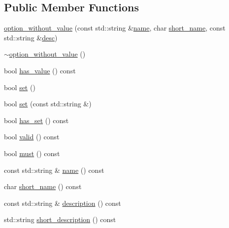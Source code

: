\subsection*{Public Member Functions}
\begin{DoxyCompactItemize}
\item 
\mbox{\hyperlink{classcmdline_1_1parser_1_1option__without__value_a3a750fc5d29bd692fdefd6f41b5ce341}{option\+\_\+without\+\_\+value}} (const std\+::string \&\mbox{\hyperlink{classcmdline_1_1parser_1_1option__without__value_a3b163022cec8a3e3cf816ea70a36abd4}{name}}, char \mbox{\hyperlink{classcmdline_1_1parser_1_1option__without__value_a6a4f9070fc44c46584515ad0a72a75af}{short\+\_\+name}}, const std\+::string \&\mbox{\hyperlink{classcmdline_1_1parser_1_1option__without__value_aef631becaab8312bd32051815f63275b}{desc}})
\item 
\mbox{\hyperlink{classcmdline_1_1parser_1_1option__without__value_a61b419f94d8f49212eea2c86bb2520e7}{$\sim$option\+\_\+without\+\_\+value}} ()
\item 
bool \mbox{\hyperlink{classcmdline_1_1parser_1_1option__without__value_abf481f9d4f936c8ab27fed99a747164f}{has\+\_\+value}} () const
\item 
bool \mbox{\hyperlink{classcmdline_1_1parser_1_1option__without__value_a14d3ef6f444aefebda41669d21b24008}{set}} ()
\item 
bool \mbox{\hyperlink{classcmdline_1_1parser_1_1option__without__value_ad8e93b69a9adb63f65a793d2c8099aae}{set}} (const std\+::string \&)
\item 
bool \mbox{\hyperlink{classcmdline_1_1parser_1_1option__without__value_aa56f159aff4c9cd7bde01294077724e8}{has\+\_\+set}} () const
\item 
bool \mbox{\hyperlink{classcmdline_1_1parser_1_1option__without__value_ad1dd50b3fd7c7020d817d1e173240ba3}{valid}} () const
\item 
bool \mbox{\hyperlink{classcmdline_1_1parser_1_1option__without__value_a57b95fab703aba31c702697ab25c9316}{must}} () const
\item 
const std\+::string \& \mbox{\hyperlink{classcmdline_1_1parser_1_1option__without__value_a3b163022cec8a3e3cf816ea70a36abd4}{name}} () const
\item 
char \mbox{\hyperlink{classcmdline_1_1parser_1_1option__without__value_a6a4f9070fc44c46584515ad0a72a75af}{short\+\_\+name}} () const
\item 
const std\+::string \& \mbox{\hyperlink{classcmdline_1_1parser_1_1option__without__value_ad6912e60b2dc1157ba982d882292ab28}{description}} () const
\item 
std\+::string \mbox{\hyperlink{classcmdline_1_1parser_1_1option__without__value_a094839df784a0f6a5044ec42d682f845}{short\+\_\+description}} () const
\end{DoxyCompactItemize}

